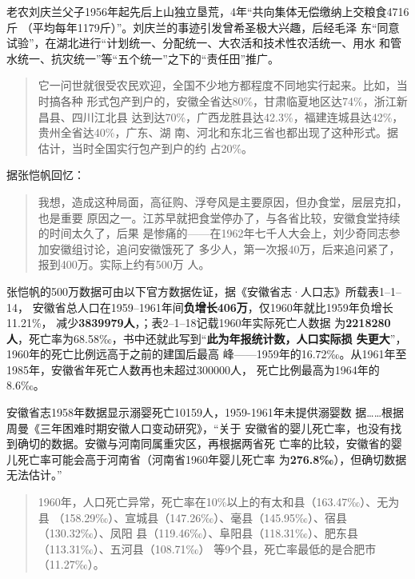{老农刘庆兰父子1956年起先后上山独立垦荒，4年“共向集体无偿缴纳上交粮食4716斤
（平均每年1179斤）”。\cite{anhuiliushi}刘庆兰的事迹引发曾希圣极大兴趣，后经毛泽
东“同意试验”，在湖北进行“计划统一、分配统一、大农活和技术性农活统一、用水
和管水统一、抗灾统一”等“五个统一”之下的“责任田”推广。

\begin{quotation}
  它一问世就很受农民欢迎，全国不少地方都程度不同地实行起来。比如，当时搞各种
  形式包产到户的，安徽全省达80\%，甘肃临夏地区达74\%，浙江新昌县、四川江北县
  达到达70\%，广西龙胜县达42.3\%，福建连城县达42\%，贵州全省达40\%，广东、湖
  南、河北和东北三省也都出现了这种形式。据估计，当时全国实行包产到户的约
  占20\%。\cite[1078]{boyibo}
\end{quotation}

据张恺帆回忆：
\begin{quotation}
  我想，造成这种局面，高征购、浮夸风是主要原因，但办食堂，层层克扣，也是重要
  原因之一。江苏早就把食堂停办了，与各省比较，安徽食堂持续的时间太久了，后果
  是惨痛的——在1962年七千人大会上，刘少奇同志参加安徽组讨论，追问安徽饿死了
  多少人，第一次报40万，后来追问紧了，报到400万。实际上约有500万
  人。\cite[344]{zhangkaifanhuiyi}
\end{quotation}

张恺帆的500万数据可由以下官方数据佐证，据《安徽省志·人口志》所载表1--1--14，
安徽省总人口在1959--1961年间\textbf{负增长406万}，仅1960年就比1959年负增长11.21\%，
减少\textbf{3839979人}，\cite[27]{anhuishengzhi}；表2--1--18记载1960年实际死亡人数据
为\textbf{2218280人}，死亡率为68.58‰，书中还就此写到“\textbf{此为年报统计数，人口实际损
  失更大}”，1960年的死亡比例远高于之前的建国后最高
峰——1959年的16.72‰。从1961年至1985年，安徽省年死亡人数再也未超过300000人，
死亡比例最高为1964年的8.6‰。\cite[95-96]{anhuishengzhi}

安徽省志1958年数据显示溺婴死亡10159人，1959-1961年未提供溺婴数
据……\cite[108]{anhuishengzhi}根据周曼《三年困难时期安徽人口变动研究》，“关于
安徽省的婴儿死亡率，也没有找到确切的数据。安徽与河南同属重灾区，再根据两省死
亡率的比较，安徽省的婴儿死亡率可能会高于河南省（河南省1960年婴儿死亡率
为\textbf{276.8‰}），但确切数据无法估计。”

\begin{quotation}
  1960年，人口死亡异常，死亡率在10\%以上的有太和县（163.47‰）、无为县
  （158.29‰）、宣城县（147.26‰）、毫县（145.95‰）、宿县（130.32‰）、凤阳
  县（119.46‰）、阜阳县（118.31‰）、肥东县（113.31‰）、五河县（108.71‰）
  等9个县，死亡率最低的是合肥市（11.27‰）。\cite[98]{anhuishengzhi}


\end{quotation}}
